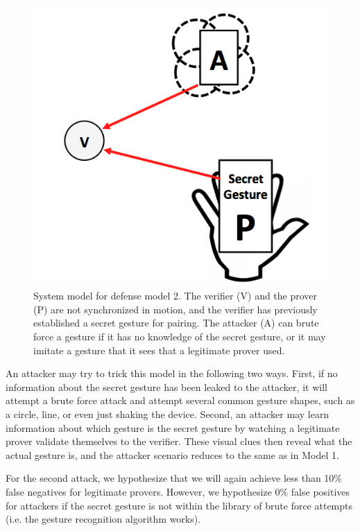 \begin{itemize}
\begin{figure}[!tb]
\centering
\includegraphics[width=0.6 \linewidth]{./figures/model2.png}
\caption{System model for defense model 2. The verifier (V) and the prover (P) are not synchronized in motion, and the verifier has previously established a secret gesture for pairing. The attacker (A) can brute force a gesture if it has no knowledge of the secret gesture, or it may imitate a gesture that it sees that a legitimate prover used.}
\label{fig:Model2}
\end{figure}

An attacker may try to trick this model in the following two ways. First, if no information about the secret gesture has been leaked to the attacker, it will attempt a brute force attack and attempt several common gesture shapes, such as a circle, line, or even just shaking the device. Second, an attacker may learn information about which gesture is the secret gesture by watching a legitimate prover validate themselves to the verifier. These visual clues then reveal what the actual gesture is, and the attacker scenario reduces to the same as in Model 1. 

For the second attack, we hypothesize that we will again achieve less than 10\% false negatives for legitimate provers. However, we hypothesize 0\% false positives for attackers if the secret gesture is not within the library of brute force attempts (i.e. the gesture recognition algorithm works). 


\end{itemize}
